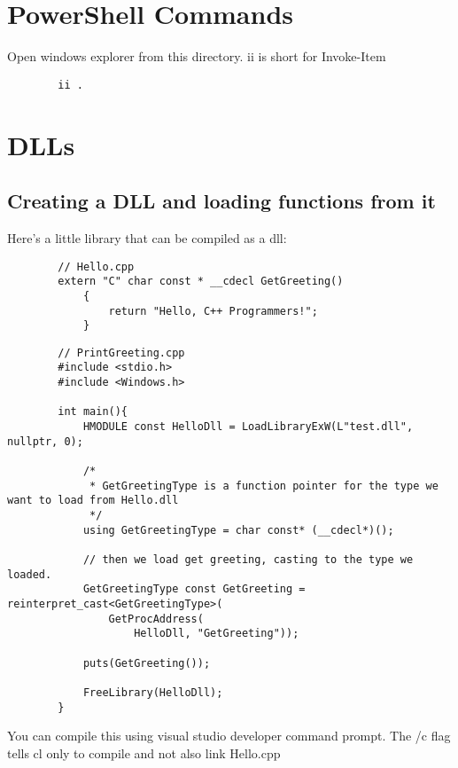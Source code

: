 \documentclass[../LabBook]{subfiles}
\begin{document}
\section{PowerShell Commands}

    Open windows explorer from this directory. ii is short for Invoke-Item
    \begin{verbatim}
        ii .
    \end{verbatim}



\section{DLLs}

\subsection{Creating a DLL and loading functions from it}

Here's a little library that can be compiled as a dll:

    \begin{verbatim}
        // Hello.cpp
        extern "C" char const * __cdecl GetGreeting()
            {
                return "Hello, C++ Programmers!";
            }
    \end{verbatim}

    \begin{verbatim}
        // PrintGreeting.cpp
        #include <stdio.h>
        #include <Windows.h>

        int main(){
            HMODULE const HelloDll = LoadLibraryExW(L"test.dll", nullptr, 0);

            /*
             * GetGreetingType is a function pointer for the type we want to load from Hello.dll
             */
            using GetGreetingType = char const* (__cdecl*)();

            // then we load get greeting, casting to the type we loaded.
            GetGreetingType const GetGreeting = reinterpret_cast<GetGreetingType>(
                GetProcAddress(
                    HelloDll, "GetGreeting"));

            puts(GetGreeting());

            FreeLibrary(HelloDll);
        }
    \end{verbatim}

    You can compile this using visual studio developer command prompt. The /c flag tells cl only to compile and not also link Hello.cpp
\end{document}
